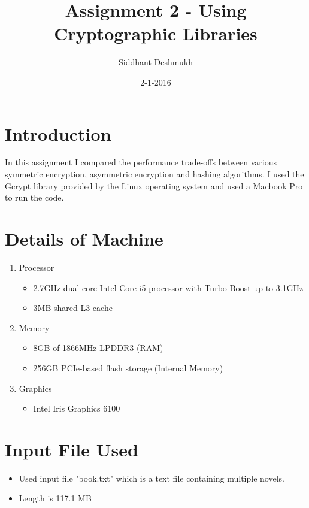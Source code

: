 \documentclass[11pt, pdftex]{article}
\title{Assignment 2 - Using Cryptographic Libraries}
\author{Siddhant Deshmukh}
\date{2-1-2016}
\begin{document}
\maketitle



\section{Introduction}
In this assignment I compared the performance trade-offs between various symmetric encryption, asymmetric encryption and hashing algorithms. I used the Gcrypt library provided by the Linux operating system and used a Macbook Pro to run the code.


\section{Details of Machine}
\begin{enumerate}
	\item Processor
	\begin{itemize}
		\item 2.7GHz dual-core Intel Core i5 processor with Turbo Boost up to 3.1GHz
		\item 3MB shared L3 cache
	\end{itemize}
	\item Memory
	\begin{itemize}
		\item 8GB of 1866MHz LPDDR3 (RAM)
		\item 256GB PCIe-based flash storage (Internal Memory)
	\end{itemize}
	\item Graphics
	\begin{itemize}
		\item Intel Iris Graphics 6100
	\end{itemize}
	
\end{enumerate}

\section{Input File Used}
\begin{itemize}
	\item Used input file "book.txt" which is a text file containing multiple novels.
	\item Length is 117.1 MB
\end{itemize}
\end{document}
